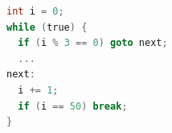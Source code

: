 \documentclass[tikz]{standalone}
\begin{document}
\begin{lrbox}{\exCode}
\begin{lstlisting}[language=C,style=smaller]
int i = 0;
while (true) {
  if (i % 3 == 0) goto next;
  ...
next:
  i += 1;
  if (i == 50) break;
}
\end{lstlisting}
\end{lrbox}






\end{document}
